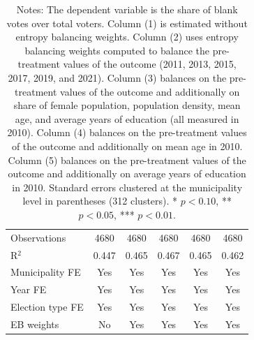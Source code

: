 \begin{table}[!h]
\begin{tabular}[t]{lccccc}
\addlinespace
Observations & 4680 & 4680 & 4680 & 4680 & 4680\\
R$^2$ & 0.447 & 0.465 & 0.467 & 0.465 & 0.462\\
Municipality FE & Yes & Yes & Yes & Yes & Yes\\
Year FE & Yes & Yes & Yes & Yes & Yes\\
Election type FE & Yes & Yes & Yes & Yes & Yes\\
EB weights & No & Yes & Yes & Yes & Yes\\
\hline
\end{tabular}
\vspace{0.3em}
\captionsetup{justification=justified, singlelinecheck=false}
\caption*{\footnotesize Notes: The dependent variable is the share of blank votes over total voters. Column (1) is estimated without entropy balancing weights. Column (2) uses entropy balancing weights computed to balance the pre-treatment values of the outcome (2011, 2013, 2015, 2017, 2019, and 2021). Column (3) balances on the pre-treatment values of the outcome and additionally on share of female population, population density, mean age, and average years of education (all measured in 2010). Column (4) balances on the pre-treatment values of the outcome and additionally on mean age in 2010. Column (5) balances on the pre-treatment values of the outcome and additionally on average years of education in 2010. Standard errors clustered at the municipality level in parentheses (312 clusters). * $p<0.10$, ** $p<0.05$, *** $p<0.01$.}
\end{table}
